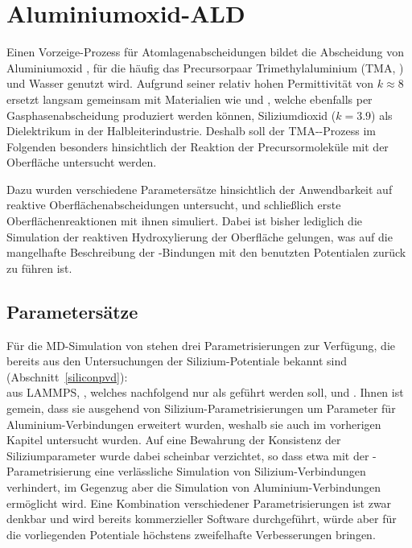 \section{Aluminiumoxid-ALD}
\label{aluminaald}

Einen Vorzeige-Prozess für Atomlagenabscheidungen bildet die Abscheidung von Aluminiumoxid \cite{puurunen_surface_2005}, für die häufig das Precursorpaar Trimethylaluminium (TMA, ) und Wasser genutzt wird.
Aufgrund seiner relativ hohen Permittivität von $k\approx 8$ ersetzt  langsam gemeinsam mit Materialien wie  und , welche ebenfalls per Gasphasenabscheidung produziert werden können\cite{smith_chemical_2000}, Siliziumdioxid ($k=3.9$) als Dielektrikum in der Halbleiterindustrie.
Deshalb soll der TMA--Prozess im Folgenden besonders hinsichtlich der Reaktion der Precursormoleküle mit der Oberfläche untersucht werden.

Dazu wurden verschiedene Parametersätze hinsichtlich der Anwendbarkeit auf reaktive Oberflächenabscheidungen untersucht, und schließlich erste Oberflächenreaktionen mit ihnen simuliert.
Dabei ist bisher lediglich die Simulation der reaktiven Hydroxylierung der Oberfläche gelungen, was auf die mangelhafte Beschreibung der -Bindungen mit den benutzten Potentialen zurück zu führen ist.

\subsection{Parametersätze}

Für die MD-Simulation von  stehen drei Parametrisierungen zur Verfügung, die bereits aus den Untersuchungen der Silizium-Potentiale bekannt sind (Abschnitt~\ref{siliconpvd}):\\
 aus LAMMPS\cite{plimpton_lammps_2014}, \cite{liu_development_2012}, welches nachfolgend nur als  geführt werden soll, und \cite{narayanan_reactive_2012}.
Ihnen ist gemein, dass sie ausgehend von Silizium-Parametrisierungen um Parameter für Aluminium-Verbindungen erweitert wurden, weshalb sie auch im vorherigen Kapitel untersucht wurden.
Auf eine Bewahrung der Konsistenz der Siliziumparameter wurde dabei scheinbar verzichtet, so dass etwa mit der -Parametrisierung eine verlässliche Simulation von Silizium-Verbindungen verhindert, im Gegenzug aber die Simulation von Aluminium-Verbindungen ermöglicht wird.
Eine Kombination verschiedener Parametrisierungen ist zwar denkbar und wird bereits kommerzieller Software durchgeführt\cite{biovia_materials_2014}, würde aber für die vorliegenden Potentiale höchstens zweifelhafte Verbesserungen bringen.

